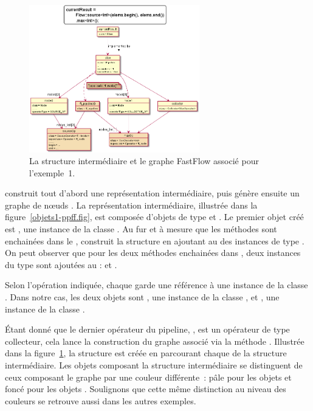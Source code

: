 \begin{figure}
\centering
         \includegraphics[width=0.66\textwidth]{Figures/objets1-ff.png}
      \caption{La structure interm\'ediaire  et le graphe FastFlow associé pour l'exemple~1.}
       \label{objets1-ff.fig}
\end{figure}

 construit tout d'abord une repr\'esentation interm\'ediaire, puis g\'en\`ere ensuite un graphe de n\oe{}uds . La repr\'esentation interm\'ediaire, illustr\'ee dans la figure~\ref{objets1-ppff.fig}, est compos\'ee d'objets de type  et . Le premier objet cr\'e\'e est , une instance de la classe . Au fur et \`a mesure que les m\'ethodes sont enchain\'ees dans le ,  construit la structure en ajoutant au  des instances de type . On peut observer que pour les deux m\'ethodes enchain\'ees dans , deux instances du type  sont ajout\'ees au  :  et . 

Selon l'opération indiquée, chaque  garde une r\'ef\'erence \`a une instance de la classe . Dans notre cas, les deux objets  sont , une instance de la classe , et , une instance de la classe . 



\'Etant donn\'e que le dernier op\'erateur du {pipeline}, , est un op\'erateur de type collecteur, cela lance la construction du graphe  associ\'e via la m\'ethode . Illustr\'ee dans la figure~\ref{objets1-ff.fig}, la structure  est cr\'e\'ee en parcourant chaque  de la structure interm\'ediaire. 
%
Les objets composant la structure interm\'ediaire se distinguent de ceux composant le graphe  par une couleur diff\'erente~: p\^ale pour les objets  et fonc\'e pour les objets . Soulignons que cette même distinction au niveau des couleurs se retrouve aussi dans les autres exemples. 

